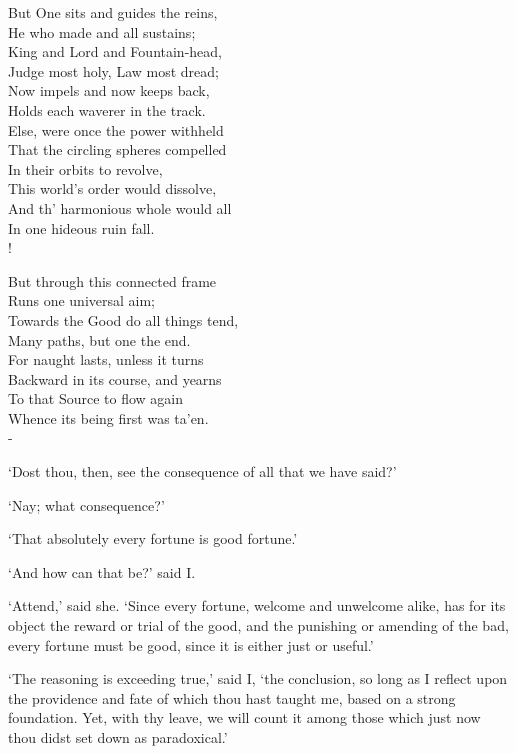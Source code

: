 \documentclass[12pt]{book}
\newenvironment{ipoem}[1]%
  {\setcounter{poemindentevery}{#1}\begin{poem}\small}%
  {\end{poem}\setcounter{poemindentevery}{0}}
\begin{document}
\begin{ipoem}{0}
    But One sits and guides the reins, \\
    He who made and all sustains; \\
    King and Lord and Fountain-head, \\
    Judge most holy, Law most dread; \\
    Now impels and now keeps back, \\
    Holds each waverer in the track. \\
    Else, were once the power withheld \\
    That the circling spheres compelled \\
    In their orbits to revolve, \\
    This world's order would dissolve, \\
    And th' harmonious whole would all \\
    In one hideous ruin fall. \\!

    But through this connected frame \\
    Runs one universal aim; \\
    Towards the Good do all things tend, \\
    Many paths, but one the end. \\
    For naught lasts, unless it turns \\
    Backward in its course, and yearns \\
    To that Source to flow again \\
    Whence its being first was ta'en. \\-
\end{ipoem}

`Dost thou, then, see the consequence of all that we have said?'

`Nay; what consequence?'

`That absolutely every fortune is good fortune.'

`And how can that be?' said I.

`Attend,' said she. `Since every fortune, welcome and unwelcome alike,
has for its object the reward or trial of the good, and the punishing or
amending of the bad, every fortune must be good, since it is either just
or useful.'

`The reasoning is exceeding true,' said I, `the conclusion, so long as I
reflect upon the providence and fate of which thou hast taught me, based
on a strong foundation. Yet, with thy leave, we will count it among
those which just now thou didst set down as paradoxical.'
\end{document}
